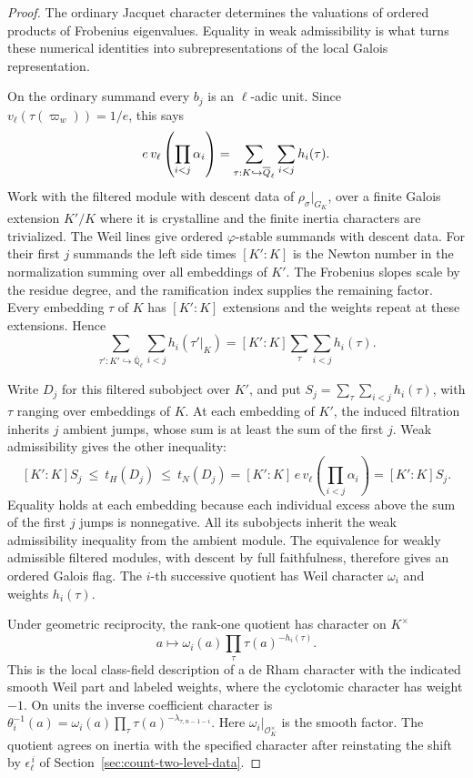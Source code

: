 \begin{proof}
The ordinary Jacquet character determines the valuations of ordered products of Frobenius eigenvalues. Equality in weak admissibility is what turns these numerical identities into subrepresentations of the local Galois representation.

On the ordinary summand every \(b_j\) is an \(\ell\)-adic
unit. Since \(v_\ell(\tau(\varpi_w))=1/e\), this says
\[
 e\,v_\ell\left(\prod_{i<j}\alpha_i\right)
       = \sum_{\tau:K\hookrightarrow\overline{Q}_\ell}
                      \sum_{i<j}h_i(\tau).
\]
Work with the filtered module with descent data of
\(\rho_\sigma|_{G_K}\), over a finite Galois extension \(K'/K\)
where it is crystalline and the finite inertia characters
are trivialized.
The Weil lines give ordered \(\varphi\)-stable summands
with descent data. For their first \(j\) summands the
left side times \([K':K]\) is the Newton number in the
normalization summing over all embeddings of \(K'\).
The Frobenius slopes scale by the residue degree, and the
ramification index supplies the remaining factor.
Every embedding \(\tau\) of \(K\) has \([K':K]\) extensions and the weights repeat at these extensions. Hence
\[
 \sum_{\tau' : K'\hookrightarrow\overline{\mathbb Q}_\ell}\sum_{i<j}h_i(\tau'|_K)=[K':K]\sum_\tau\sum_{i<j}h_i(\tau).
\]

Write \(D_j\) for this filtered subobject over \(K'\), and put
\(S_j=\sum_{\tau}\sum_{i<j}h_i(\tau)\), with \(\tau\) ranging
over embeddings of \(K\). At each embedding of \(K'\),
the induced filtration inherits \(j\) ambient jumps, whose sum
is at least the sum of the first \(j\). Weak admissibility gives
the other inequality:
\[
 [K':K]S_j\ \le\ t_H(D_j)\ \le\ t_N(D_j)
     =[K':K]\,e\,v_\ell\!\left(\prod_{i<j}\alpha_i\right)
     =[K':K]S_j .
\]
Equality holds at each embedding because each individual excess
above the sum of the first \(j\) jumps is nonnegative. All its subobjects inherit the weak
admissibility inequality from the ambient module.
The equivalence for weakly admissible filtered modules,
with descent by full faithfulness, therefore gives
an ordered Galois flag. The \(i\)-th successive quotient
has Weil character \(\omega_i\) and weights \(h_i(\tau)\).
\cite{colmez-fontaine}

Under geometric reciprocity, the rank-one quotient has
character on \(K^\times\)
\[
    a\longmapsto \omega_i(a)
                     \prod_\tau\tau(a)^{-h_i(\tau)}.
\]
This is the local class-field description of a de Rham
character with the indicated smooth Weil part and labeled
weights, where the cyclotomic character has weight \(-1\).
On units the inverse coefficient character is
\(\theta_i^{-1}(a)=\omega_i(a)
\prod_\tau\tau(a)^{-\lambda_{\tau,n-1-i}}\).
Here \(\omega_i|_{\mathcal O_K^\times}\) is the smooth
factor. The quotient agrees on inertia with the
specified character after reinstating the shift by
\(\epsilon_\ell^{\,i}\) of Section~\ref{sec:count-two-level-data}.


\end{proof}
